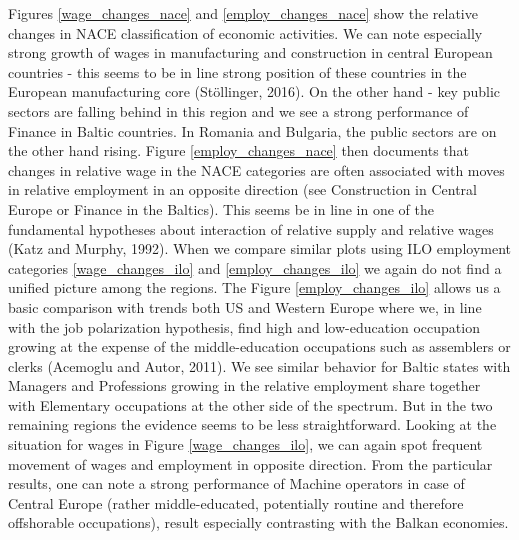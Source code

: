 \documentclass{article}
\begin{document}
Figures \ref{wage_changes_nace} and \ref{employ_changes_nace} show the relative changes in NACE classification of economic activities. We can note especially strong growth of wages in manufacturing and construction in central European countries  - this seems to be in line strong position of these countries in the European manufacturing core (Stöllinger, 2016). On the other hand - key public sectors are falling behind in this region and we see a strong performance of Finance in Baltic countries. In Romania and Bulgaria, the public sectors are on the other hand rising. Figure \ref{employ_changes_nace} then documents that changes in relative wage in the NACE categories are often associated with moves in relative employment in an opposite direction (see Construction in Central Europe or Finance in the Baltics). This seems be in line in one of the fundamental hypotheses about interaction of relative supply and relative wages (Katz and Murphy, 1992).
When we compare similar plots using ILO employment categories \ref{wage_changes_ilo} and \ref{employ_changes_ilo} we again do not find a unified picture among the regions. The Figure \ref{employ_changes_ilo} allows us a basic comparison with trends both US and Western Europe where we, in line with the job polarization hypothesis, find high and low-education occupation growing at the expense of the middle-education occupations such as assemblers or clerks (Acemoglu and Autor, 2011). We see similar behavior for Baltic states with Managers and Professions growing in the relative employment share together with Elementary occupations at the other side of the spectrum. But in the two remaining regions the evidence seems to be less straightforward. Looking at the situation for wages in Figure \ref{wage_changes_ilo}, we can again spot frequent movement of wages and employment in opposite direction. From the particular results, one can note a strong performance of Machine operators in case of Central Europe (rather middle-educated, potentially routine and therefore offshorable occupations), result especially contrasting with the Balkan economies.
\end{document}
